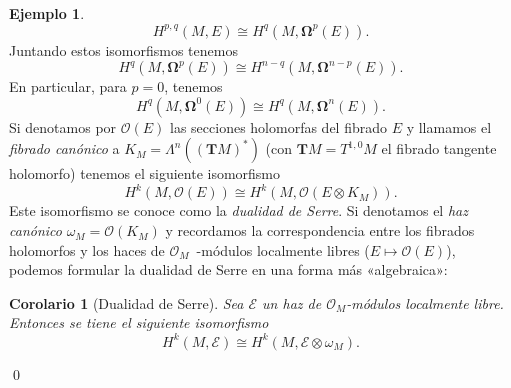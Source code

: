 \documentclass[12pt,a4paper]{article}
\newtheorem{corol}[thm]{Corolario}
\theoremstyle{definition} \newtheorem{defn}[thm]{Definición}
\theoremstyle{definition} \newtheorem{ejemplo}[thm]{Ejemplo}
\theoremstyle{definition} \newtheorem{ejercicio}[thm]{Ejercicio}
\theoremstyle{remark} \newtheorem*{obs}{Observación}
\newcommand{\bomega}{\boldsymbol{\Omega}}
\begin{document}
\begin{ejemplo}
\begin{equation*}
    H^{p,q}(M,E) \cong H^q(M,\bomega^p(E)).
  \end{equation*}
  Juntando estos isomorfismos tenemos 
  \begin{equation*}
    H^q(M,\bomega^p(E))\cong H^{n-q}(M,\bomega^{n-p}(E)).
  \end{equation*}
  En particular, para $p=0$, tenemos
  \begin{equation*}
    H^q(M,\bomega^0(E))\cong H^q(M,\bomega^n(E)).
  \end{equation*}
  Si denotamos por $\mathcal{O}(E)$ las secciones holomorfas del fibrado $E$ y llamamos el \emph{fibrado canónico} a $K_M=\Lambda^n((\mathbf{T}M)^*)$ (con $\mathbf{T}M=T^{1,0}M$ el fibrado tangente holomorfo) tenemos  el siguiente isomorfismo
  \begin{equation*}
    H^k(M,\mathcal{O}(E)) \cong H^k(M,\mathcal{O}(E\otimes K_M)).
  \end{equation*}
  Este isomorfismo se conoce como la \emph{dualidad de Serre}. 
Si denotamos el \emph{haz canónico} $\omega_M=\mathcal{O}(K_M)$ y recordamos la correspondencia entre los fibrados holomorfos y los haces de $\mathcal{O}_M$~-módulos localmente libres ($E\mapsto \mathcal{O}(E)$), podemos formular la dualidad de Serre en una forma más «algebraica»:
\begin{corol}[Dualidad de Serre]
  Sea $\mathcal{E}$ un haz de $\mathcal{O}_M$-módulos localmente libre. Entonces se tiene el siguiente isomorfismo
  \begin{equation*}
    H^k(M,\mathcal{E})\cong H^k(M,\mathcal{E}\otimes \omega_M).
  \end{equation*}
\end{corol}
\qed
\end{ejemplo}

\nocite{*}


\end{document}
